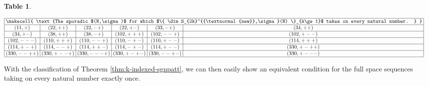 \documentclass[12pt,letterpaper,reqno]{amsart}
\theoremstyle{definition}
\newtheorem{mytable}[theorem]{Table}
\numberwithin{equation}{section}
\numberwithin{figure}{section}
\numberwithin{table}{section}
\newcommand{\nw}{{\textnormal{new}}}
\begin{document}
\begin{mytable} \label{table:sporadic-cases}

\begin{small}
\begin{equation}
\setlength{\arraycolsep}{1mm}
\begin{array}{|c|c|c|c|c|c|} 
\hline
\multicolumn{6}{|c|}{\makecell{
    \text{The sporadic $(N,\sigma)$ for which $\{ \dim S_{2k}^{\nw,\sigma}(N) \}_{k\ge1}$ takes on every natural number. }  
  }} \\
\hline 
(11,+) & (22,++) & (22,-+) & (22,+-) & (33,-+) & (34,++) \\
\hline 
(34,+-) & (38,++) & (38,-+) & (102,+++) & (102,--+) & (102,+--) \\
\hline 
(102,---) & (110,+++) & (110,--+) & (110,-+-) & (110,+--) & (114,+++) \\
\hline 
(114,+-+) & (114,--+) & (114,++-) & (114,-+-) & (114,+--) & (330,+-++) \\
\hline 
(330,--++) & (330,+--+) & (330,---+) & (330,+-+-) & (330,--+-) & (330,+---) \\
\hline
\end{array}
\end{equation}
\end{small}

\end{mytable}


With the classification of Theorem \ref{thm:k-indexed-sgnpatt}, we can then easily show an equivalent condition for the full space sequences taking on every natural number exactly once.
\end{document}
